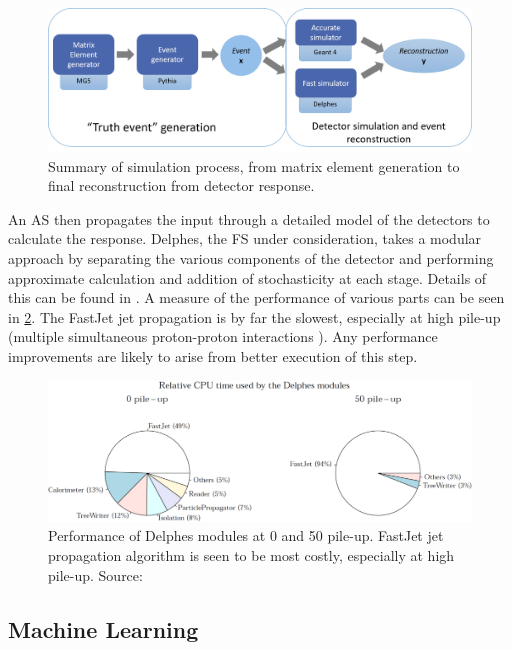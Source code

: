 \documentclass{article}
\begin{document}
\begin{figure}[H]
	\centering
	\includegraphics[width=0.8\linewidth]{img/simdiag}
	
	\caption{Summary of simulation process, from matrix element generation to final reconstruction from detector response.}
	\label{fig:simdiag}
	
\end{figure}	


An AS then propagates the input through a detailed model of the detectors to calculate the response. Delphes, the FS under consideration, takes a modular approach by separating the various components of the detector and performing approximate calculation and addition of stochasticity at each stage. Details of this can be found in \cite{delphes}. A measure of the performance of various parts can be seen in \cref{fig:delphescpu}. The FastJet jet propagation \cite{fastjet} is by far the slowest, especially at high pile-up (multiple simultaneous proton-proton interactions \cite{pileup}). Any performance improvements are likely to arise from better execution of this step. \\ 


\begin{figure}[H]
	\centering
	\includegraphics[width=0.7\linewidth]{img/delphescpu}
	
	\caption{Performance of Delphes modules at 0 and 50 pile-up. FastJet jet propagation algorithm is seen to be most costly, especially at high pile-up. Source: \cite{delphes}}
	\label{fig:delphescpu}
	
\end{figure}

 
\subsection{Machine Learning}
\label{sec:ml}
\end{document}
